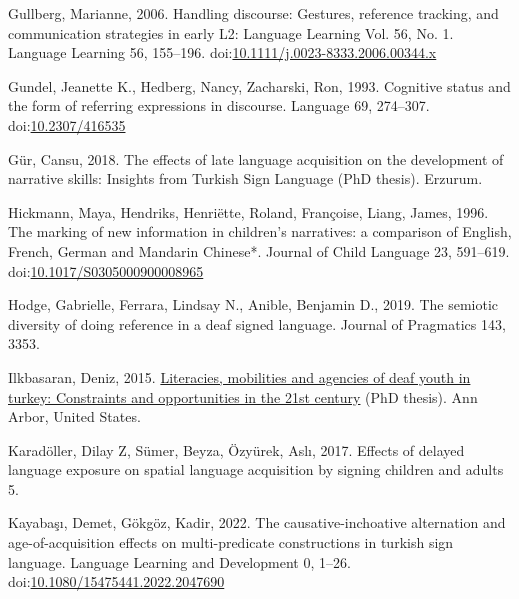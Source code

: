 \documentclass[]{elsarticle} %
\newlength{\cslhangindent}
\newenvironment{CSLReferences}[2] %
 {%
  \setlength{\parindent}{0pt}
  \ifodd #1 \everypar{\setlength{\hangindent}{\cslhangindent}}\ignorespaces\fi
  \ifnum #2 > 0
  \setlength{\parskip}{#2\baselineskip}
  \fi
 }%
 {}
\begin{document}
\begin{CSLReferences}{1}{0}
\leavevmode{}%
Gullberg, Marianne, 2006. Handling discourse: Gestures, reference
tracking, and communication strategies in early L2: Language Learning
Vol. 56, No. 1. Language Learning 56, 155--196.
doi:\href{https://doi.org/10.1111/j.0023-8333.2006.00344.x}{10.1111/j.0023-8333.2006.00344.x}

\leavevmode{}%
Gundel, Jeanette K., Hedberg, Nancy, Zacharski, Ron, 1993. Cognitive
status and the form of referring expressions in discourse. Language 69,
274--307. doi:\href{https://doi.org/10.2307/416535}{10.2307/416535}

\leavevmode{}%
Gür, Cansu, 2018. The effects of late language acquisition on the
development of narrative skills: Insights from Turkish Sign Language
(PhD thesis). Erzurum.

\leavevmode{}%
Hickmann, Maya, Hendriks, Henriëtte, Roland, Françoise, Liang, James,
1996. The marking of new information in children's narratives: a
comparison of English, French, German and Mandarin Chinese*. Journal of
Child Language 23, 591--619.
doi:\href{https://doi.org/10.1017/S0305000900008965}{10.1017/S0305000900008965}

\leavevmode{}%
Hodge, Gabrielle, Ferrara, Lindsay N., Anible, Benjamin D., 2019. The
semiotic diversity of doing reference in a deaf signed language. Journal
of Pragmatics 143, 3353.

\leavevmode{}%
Ilkbasaran, Deniz, 2015.
\href{https://www.proquest.com/docview/1656169535/abstract/16EA71911A644FC3PQ/1}{Literacies,
mobilities and agencies of deaf youth in turkey: Constraints and
opportunities in the 21st century} (PhD thesis). Ann Arbor, United
States.

\leavevmode{}%
Karadöller, Dilay Z, Sümer, Beyza, Özyürek, Aslı, 2017. Effects of
delayed language exposure on spatial language acquisition by signing
children and adults 5.

\leavevmode{}%
Kayabaşı, Demet, Gökgöz, Kadir, 2022. The causative-inchoative
alternation and age-of-acquisition effects on multi-predicate
constructions in turkish sign language. Language Learning and
Development 0, 1--26.
doi:\href{https://doi.org/10.1080/15475441.2022.2047690}{10.1080/15475441.2022.2047690}


\end{CSLReferences}
\end{document}
